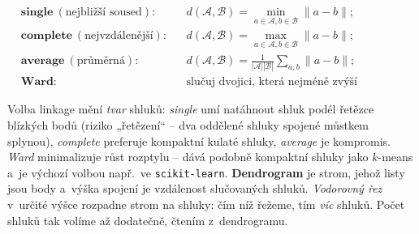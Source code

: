 \begin{definice}
\[
\begin{aligned}
&\textbf{single}\ (\text{nejbližší soused}): && d(\mathcal A,\mathcal B)=\min_{a\in\mathcal A,b\in\mathcal B}\|a-b\|;\\
&\textbf{complete}\ (\text{nejvzdálenější}): && d(\mathcal A,\mathcal B)=\max_{a\in\mathcal A,b\in\mathcal B}\|a-b\|;\\
&\textbf{average}\ (\text{průměrná}): && d(\mathcal A,\mathcal B)=\tfrac{1}{|\mathcal A||\mathcal B|}\sum_{a,b}\|a-b\|;\\
&\textbf{Ward}: && \text{slučuj dvojici, která nejméně zvýší vnitroshlukový rozptyl.}
\end{aligned}
\]
\end{definice}

\begin{intuice}
Volba linkage mění \emph{tvar} shluků: \emph{single} umí natáhnout shluk podél řetězce blízkých bodů (riziko „řetězení`` -- dva oddělené shluky spojené můstkem splynou), \emph{complete} preferuje kompaktní kulaté shluky, \emph{average} je kompromis. \emph{Ward} minimalizuje růst rozptylu -- dává podobně kompaktní shluky jako $k$-means a~je výchozí volbou např.\ ve \texttt{scikit-learn}. \textbf{Dendrogram} je strom, jehož listy jsou body a~výška spojení je vzdálenost slučovaných shluků. \emph{Vodorovný řez} v~určité výšce rozpadne strom na shluky: čím níž řežeme, tím \emph{víc} shluků. Počet shluků tak volíme až dodatečně, čtením z~dendrogramu.
\end{intuice}

